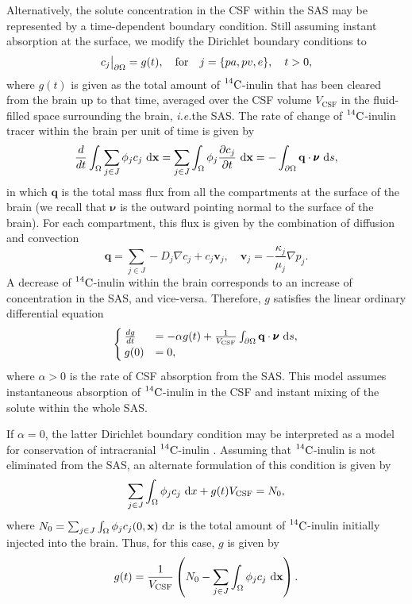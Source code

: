 \documentclass[a4paper,11pt]{article}
\newcommand\restr[2]{{%
\left.\kern-\nulldelimiterspace %
#1 %
\vphantom{\big|} %
\right|_{#2} %
}}
\newcommand{\ie}{\emph{i.e.}\;}
\newcommand{\1}{^{(1)}}
\newcommand{\2}{^{(2)}}
\newcommand*{\dd}{\mathop{\kern0pt\mathrm{d}}\!{}}
\newcommand {\x}   {\mathbf{x}}
\newcommand{\Cinulin}{$\prescript{14}{}{\text{C}}$-inulin }
\begin{document}
Alternatively, the solute concentration in the CSF within the SAS may be represented by a time-dependent boundary condition. Still assuming instant absorption at the surface, we modify the Dirichlet boundary conditions to
\begin{equation}
     \restr{c_j}{\partial \Omega} =  g(t),\quad \text{for}\quad j=\{pa,pv,e \}, \quad t >0,
    \label{eq:inulin-inhomogeneous-dirichlet}
\end{equation}
where $ g(t)$ is given as the total amount of \Cinulin that has been cleared from the brain up to that time, averaged over the CSF volume $ V_\text{CSF} $ in the fluid-filled space surrounding the brain, \ie the SAS. The rate of change of \Cinulin tracer within the brain per unit of time is given by
\begin{equation}
    \frac{d}{dt}\int_{\Omega} \sum_{j\in J} \phi_j c_j \,\dd \x= \sum_{j\in J} \int_{\Omega} \phi_j \frac{\partial c_j}{\partial t} \,\dd \x=   - \int_{\partial \Omega}  \mathbf{q} \cdot \pmb{\nu} \,\dd s  ,
\end{equation}
in which $\mathbf{q}$ is the total mass flux from all the compartments at the surface of the brain (we recall that $\pmb{\nu}$ is the outward pointing normal to the surface of the brain). 
For each compartment, this flux is given by the combination of diffusion and convection 
\[
    \mathbf{q} =  \sum_{j\in J}  - D_j\nabla c_j + c_j \mathbf{v}_j,\quad \mathbf{v}_j = -\frac{\kappa_j}{\mu_j}\nabla p_j.   
\]
A decrease of \Cinulin within the brain corresponds to an increase of concentration in the SAS, and vice-versa. Therefore, $g$ satisfies the linear ordinary differential equation 
\begin{equation}
    \begin{cases}
        \frac{dg}{dt} &= - \alpha g(t)  + \frac{1}{V_\text{CSF}} \int_{\partial \Omega}  \mathbf{q} \cdot\pmb{\nu}\,\dd s, \\
        g(0) &= 0,
    \end{cases}
    \label{eq:inulin-boundary-inhomogeneous}
\end{equation}
where $\alpha > 0$ is the rate of CSF absorption from the SAS. 
This model assumes instantaneous absorption of \Cinulin in the CSF and instant mixing of the solute within the whole SAS. 

If $\alpha = 0$, the latter Dirichlet boundary condition may be interpreted as a model for conservation of intracranial \Cinulin. Assuming that \Cinulin is not eliminated from the SAS, an alternate formulation of this condition is given by
\begin{equation}
    \sum_{j\in J} \int_\Omega  \phi_j c_j \,\dd x + g(t) V_{\text{CSF}} = N_0,
    \label{eq:inulin-tracer-conservation}
\end{equation}
where $N_0 = \sum_{j\in J} \int_\Omega  \phi_j c_j(0,\x) \,\dd x $ is the total amount of \Cinulin initially injected into the brain. Thus, for this case, $g$ is given by 
\begin{equation}
    g(t) = \frac{1}{ V_{\text{CSF}}}\left( N_0  - \sum_{j\in J} \int_\Omega  \phi_j c_j \,\dd \x \right) .
    \label{eq:g-conservation}
\end{equation}
\end{document}
